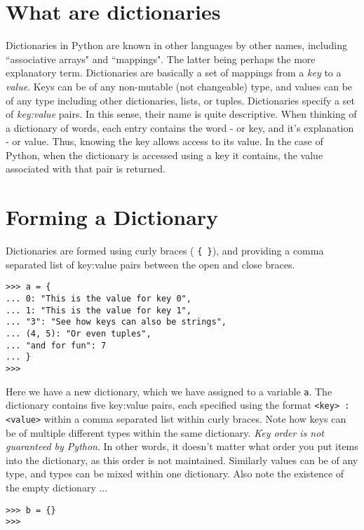 \section{What are dictionaries}

Dictionaries in Python are known in other languages by other names,   including ``associative arrays" and ``mappings". The latter being perhaps   the more explanatory term. Dictionaries are basically a set of mappings   from a \textit{key} to a \textit{value}. Keys can be of   any non-mutable (not changeable) type, and values can be of any type including other   dictionaries, lists, or tuples. Dictionaries specify a set of \textit{key:value}   pairs. In this sense, their name is quite descriptive. When thinking of a dictionary of words, each entry contains the word - or key, and it's explanation - or value.     Thus, knowing the key allows access to its value. In the case of Python, when the dictionary is accessed using a key it   contains, the value associated with that pair is returned.

\section{Forming a Dictionary}

Dictionaries are formed using curly braces (
\texttt{\{ \}}), and   providing a comma separated list of key:value pairs between the open   and close braces.
\lstset{keywordstyle=\ttfamily}
\begin{lstlisting}
>>> a = {
... 0: "This is the value for key 0",
... 1: "This is the value for key 1",
... "3": "See how keys can also be strings",
... (4, 5): "Or even tuples",
... "and for fun": 7
... }
>>>
\end{lstlisting}
\lstset{keywordstyle=\textbf}

Here we have a new dictionary, which we have assigned to a variable   \texttt{a}. The dictionary contains five key:value pairs, each specified using   the format 
\texttt{<key> : <value>} within a comma   separated list within curly braces. Note how keys can be of multiple   different types within the same dictionary. \textit{Key order is not   guaranteed by Python}. In other words, it doesn't matter what order you put items into the dictionary, as this order is not maintained.     Similarly values can be of any type, and   types can be mixed within one dictionary. Also note the existence of   the empty dictionary ...
\begin{lstlisting}
>>> b = {}
>>>
\end{lstlisting}

